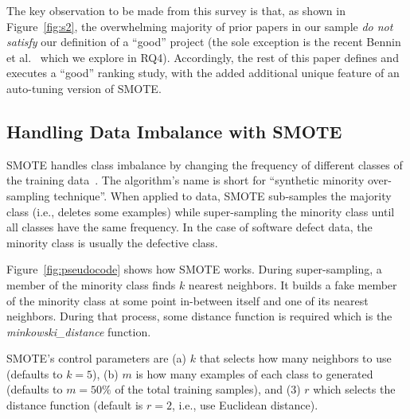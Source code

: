\documentclass[sigconf]{acmart}
\theoremstyle{break}
\theoremstyle{break}
\newcommand{\sma}{{\sc SMOTE}}
\begin{document}
The key observation to be made from  this 
survey is that, as shown in Figure~\ref{fig:s2}, the overwhelming majority of
prior papers in our sample {\em do not satisfy}  our definition of a ``good'' project
(the sole exception is the  recent   Bennin et al.~\cite{bennin2017mahakil} which we explore in RQ4).
Accordingly, the rest of this
paper defines and executes a ``good'' ranking  study, with the added additional
unique feature of   an auto-tuning version of {\sma}.

\subsection{Handling Data Imbalance with SMOTE}
\label{sect:smote}

{\sma} handles class imbalance by changing the frequency of different classes of the training
data~\cite{chawla2002smote}. 
The algorithm's name is short for ``synthetic minority over-sampling technique''.
When applied to data, {\sma} sub-samples the majority class (i.e., deletes some examples)
while super-sampling the minority class
until
all classes have the same frequency.  In the case of software defect data,
the minority class is usually the  defective class.

Figure~\ref{fig:pseudocode} shows how {\sma} works. During super-sampling,
a member of the minority class finds $k$ nearest neighbors. It builds a fake member
of the minority class at some point in-between itself and one of its nearest
neighbors.  During that process, some distance function is required which is the {\em minkowski\_distance} function. 

{\sma}'s control parameters are (a) $k$ that selects how many neighbors to use  (defaults to $k=5$), (b) $m$ is how many examples of each class to generated (defaults to $m=50\%$ of the total training samples), and (3) $r$ which selects  the distance function (default is $r=2$,
i.e., use    
  Euclidean distance).

\end{document}
